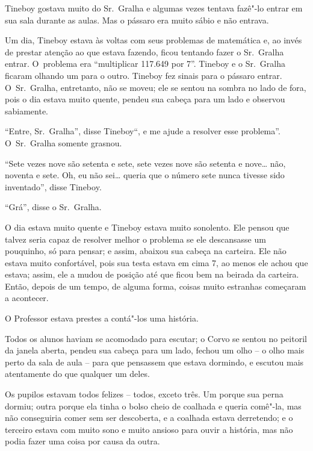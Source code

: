 

Tineboy gostava muito do Sr.~Gralha e algumas vezes tentava fazê"-lo
entrar em sua sala durante as aulas. Mas o pássaro era muito sábio e não
entrava.

Um dia, Tineboy estava às voltas com seus problemas de matemática e, ao
invés de prestar atenção ao que estava fazendo, ficou tentando fazer o
Sr.~Gralha entrar. O~problema era ``multiplicar 117.649 por 7''. Tineboy
e o Sr.~Gralha ficaram olhando um para o outro. Tineboy fez sinais para
o pássaro entrar. O~Sr.~Gralha, entretanto, não se moveu; ele se sentou
na sombra no lado de fora, pois o dia estava muito quente, pendeu sua
cabeça para um lado e observou sabiamente.

``Entre, Sr.~Gralha'', disse Tineboy``, e me ajude a resolver esse
problema''. O~Sr.~Gralha somente grasnou.

``Sete vezes nove são setenta e sete, sete vezes nove são setenta e
nove… não, noventa e sete. Oh, eu não sei… queria que o
número sete nunca tivesse sido inventado'', disse Tineboy.

``Grá'', disse o Sr.~Gralha.

O dia estava muito quente e Tineboy estava muito sonolento. Ele pensou
que talvez seria capaz de resolver melhor o problema se ele descansasse
um pouquinho, só para pensar; e assim, abaixou sua cabeça na carteira.
Ele não estava muito confortável, pois sua testa estava em cima 7, ao menos
ele achou que estava; assim, ele a mudou de posição até que ficou bem na
beirada da carteira. Então, depois de um tempo, de alguma forma, coisas
muito estranhas começaram a acontecer.

O Professor estava prestes a contá"-los uma história.

Todos os alunos haviam se acomodado para escutar; o Corvo se sentou no
peitoril da janela aberta, pendeu sua cabeça para um lado, fechou um
olho -- o olho mais perto da sala de aula -- para que pensassem que
estava dormindo, e escutou mais atentamente do que qualquer um deles.


Os pupilos estavam todos felizes -- todos, exceto três. Um porque sua
perna dormiu; outra porque ela tinha o bolso cheio de coalhada e queria
comê"-la, mas não conseguiria comer sem ser descoberta, e a coalhada
estava derretendo; e o terceiro estava com muito sono e muito ansioso
para ouvir a história, mas não podia fazer uma coisa por causa da outra.

